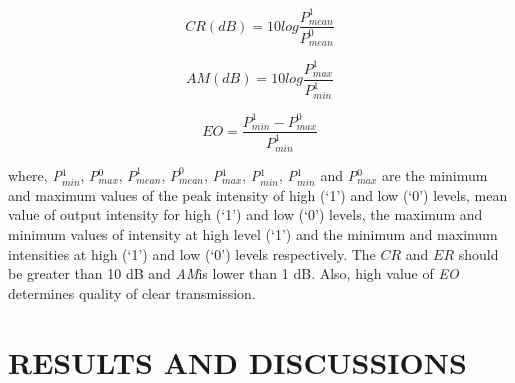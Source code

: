 \documentclass{osa-article}
\begin{document}
 \begin{equation}
CR(dB)=10log\frac{P^1_{mean}} {P^0_{mean}}
\label{eq:2}
\end{equation}

\begin{equation}
AM(dB)=10log\frac{P^1_{max}} {P^1_{min}}
\label{eq:3}
\end{equation}
 
\begin{equation}
EO=\frac{P^1_{min}-P^0_{max}} {P^1_{min}}
\label{eq:4}
\end{equation}

where, \textit {P$^1_{min}$}, \textit {P$^0_{max}$}, $P^1_{mean}$, $P^0_{mean}$,  \textit {P$^1_{max}$}, \textit {P$^1_{min}$}, \textit {P$^1_{min}$} and \textit {P$^0_{max}$} are the minimum and maximum values of the peak intensity of high (`1') and low (`0') levels, mean value of output intensity for high (`1') and low (`0') levels, the maximum and minimum values of intensity at high level (`1') and the minimum and maximum intensities at high (`1') and low (`0') levels respectively. The $CR$ and $ER$ should be greater than 10 dB and \textit{AM}is lower than 1 dB. Also, high value of \textit{EO} determines quality of clear transmission.

\section{RESULTS AND DISCUSSIONS}
\label{}
\end{document}
